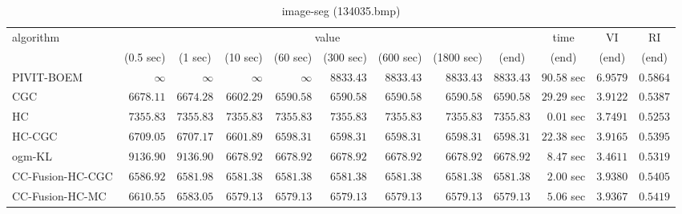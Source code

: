 \begin{table}[H]
\scriptsize
\centering
\caption{image-seg (134035.bmp)}
\label{tab:anytimetable-image-seg-134035.bmp}
\begin{tabular}{lrrrrrrrrrrr}
\toprule
           algorithm &                                   \multicolumn{8}{c}{value} & \multicolumn{1}{c}{time}    & \multicolumn{1}{c}{VI}  & \multicolumn{1}{c}{RI} \\  
\cmidrule(lr){2-9}\cmidrule(lr){10-10} \cmidrule(lr){11-11} \cmidrule(lr){12-12}   
                     & \multicolumn{1}{c}{(0.5 sec)} & \multicolumn{1}{c}{(1 sec)} & \multicolumn{1}{c}{(10 sec)} & \multicolumn{1}{c}{(60 sec)} & \multicolumn{1}{c}{(300 sec)} & \multicolumn{1}{c}{(600 sec)} & \multicolumn{1}{c}{(1800 sec)} & \multicolumn{1}{c}{(end)} & \multicolumn{1}{c}{(end)}    & \multicolumn{1}{c}{(end)}   & \multicolumn{1}{c}{(end)}  \\ \midrule 
          PIVIT-BOEM & $\infty$ & $\infty$ & $\infty$ & $\infty$ & $      8833.43$ & $      8833.43$ & $      8833.43$ & $      8833.43$ & $        90.58$ sec    & $       6.9579$  & $       0.5864$ \\ 
                 CGC & $      6678.11$ & $      6674.28$ & $      6602.29$ & $      6590.58$ & $      6590.58$ & $      6590.58$ & $      6590.58$ & $      6590.58$ & $        29.29$ sec    & $       3.9122$  & $       0.5387$ \\ 
                  HC & $      7355.83$ & $      7355.83$ & $      7355.83$ & $      7355.83$ & $      7355.83$ & $      7355.83$ & $      7355.83$ & $      7355.83$ & $         0.01$ sec    & $       3.7491$  & $       0.5253$ \\ 
              HC-CGC & $      6709.05$ & $      6707.17$ & $      6601.89$ & $      6598.31$ & $      6598.31$ & $      6598.31$ & $      6598.31$ & $      6598.31$ & $        22.38$ sec    & $       3.9165$  & $       0.5395$ \\ 
              ogm-KL & $      9136.90$ & $      9136.90$ & $      6678.92$ & $      6678.92$ & $      6678.92$ & $      6678.92$ & $      6678.92$ & $      6678.92$ & $         8.47$ sec    & $       3.4611$  & $       0.5319$ \\ 
    CC-Fusion-HC-CGC & $      6586.92$ & $      6581.98$ & $      6581.38$ & $      6581.38$ & $      6581.38$ & $      6581.38$ & $      6581.38$ & $      6581.38$ & $         2.00$ sec    & $       3.9380$  & $       0.5405$ \\ 
     CC-Fusion-HC-MC & $      6610.55$ & $      6583.05$ & $      6579.13$ & $      6579.13$ & $      6579.13$ & $      6579.13$ & $      6579.13$ & $      6579.13$ & $         5.06$ sec    & $       3.9367$  & $       0.5419$ \\ 

\end{tabular}
\end{table}

